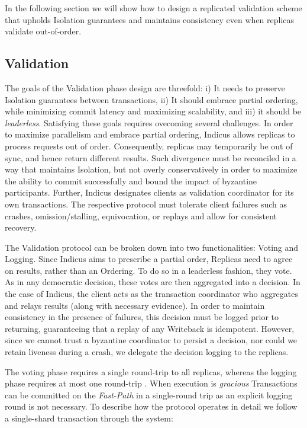 In the following section we will show how to design a replicated validation scheme that upholds Isolation guarantees and maintains consistency even when replicas validate out-of-order.




\subsection{Validation}
The goals of the Validation phase design are threefold: i) It needs to preserve Isolation guarantees between transactions, ii) It should embrace partial ordering, while minimizing commit latency and  maximizing scalability, and iii) it should be \textit{leaderless}. Satisfying these goals requires ovecoming several challenges. In order to maximize parallelism and embrace partial ordering, Indicus allows replicas to process requests out of order. Consequently, replicas may temporarily be out of sync, and hence return different results. Such divergence must be reconciled in a way that maintains Isolation, but not overly conservatively in order to maximize the ability to commit successfully and bound the impact of byzantine participants. Further, Indicus designates clients as validation coordinator for its own transactions. The respective protocol must tolerate client failures such as crashes, omission/stalling, equivocation, or replays and allow for consistent recovery. 

The Validation protocol can be broken down into two functionalities: Voting and Logging.
Since Indicus aims to prescribe a partial order, Replicas need to agree on results, rather than an Ordering. To do so in a leaderless fashion, they vote. As in any democratic decision, these votes are then aggregated into a decision. In the case of Indicus, the client acts as the transaction coordinator who aggregates and relays results (along with necessary evidence).
 In order to maintain consistency in the presence of failures, this decision must be logged prior to returning, guaranteeing that a replay of any Writeback is idempotent.  However, since we cannot trust a byzantine coordinator to persist a decision, nor could we retain liveness during a crash, we delegate the decision logging to the replicas.

The voting phase requires a single round-trip to all replicas, whereas the logging phase requires at most one round-trip . When execution is \textit{gracious} Transactions can be committed on the \textit{Fast-Path} in a single-round trip as an explicit logging round is not necessary.
To describe how the protocol operates in detail we follow a single-shard transaction through the system:


